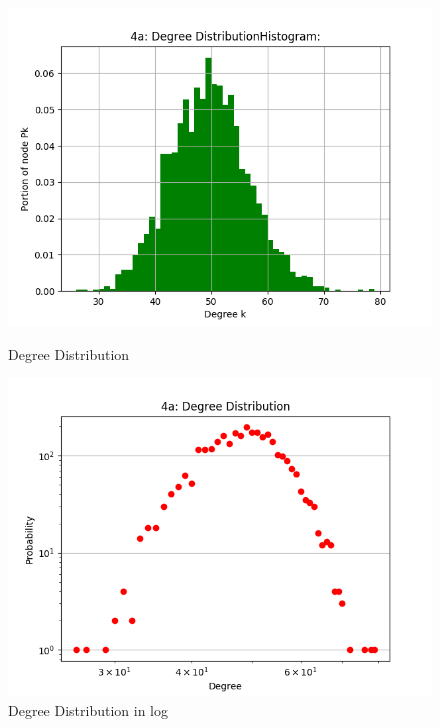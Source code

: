 \documentclass[runningheads]{llncs}
\begin{document}
\begin{figure}
    \centering
    \begin{minipage}{0.5\textwidth}
        \centering
        \includegraphics[width=\textwidth]{4a_Degree_dist_hist} %
        \caption{Degree Distribution}
        \label{fig_4a_degreedist_hist}
    \end{minipage}\hfill
    \begin{minipage}{0.5\textwidth}
        \centering
        \includegraphics[width=\textwidth]{4a_Degree_dist_log} %
        \caption{Degree Distribution in log}
        \label{fig_4a_degreedist_log}
    \end{minipage}
\end{figure}
\end{document}
